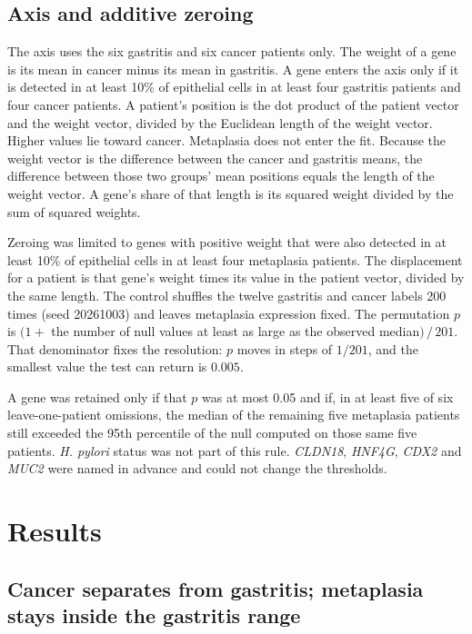 \documentclass[11pt,a4paper]{article}
\begin{document}
\subsection{Axis and additive zeroing}

The axis uses the six gastritis and six cancer patients only. The weight of a gene is its mean in cancer minus its mean in gastritis. A gene enters the axis only if it is detected in at least 10\% of epithelial cells in at least four gastritis patients and four cancer patients. A patient's position is the dot product of the patient vector and the weight vector, divided by the Euclidean length of the weight vector. Higher values lie toward cancer. Metaplasia does not enter the fit. Because the weight vector is the difference between the cancer and gastritis means, the difference between those two groups' mean positions equals the length of the weight vector. A gene's share of that length is its squared weight divided by the sum of squared weights.

Zeroing was limited to genes with positive weight that were also detected in at least 10\% of epithelial cells in at least four metaplasia patients. The displacement for a patient is that gene's weight times its value in the patient vector, divided by the same length. The control shuffles the twelve gastritis and cancer labels 200 times (seed 20261003) and leaves metaplasia expression fixed. The permutation \(p\) is \((1+\) the number of null values at least as large as the observed median\()\,/\,201\). That denominator fixes the resolution: \(p\) moves in steps of \(1/201\), and the smallest value the test can return is \(0.005\).

A gene was retained only if that \(p\) was at most 0.05 and if, in at least five of six leave-one-patient omissions, the median of the remaining five metaplasia patients still exceeded the 95th percentile of the null computed on those same five patients. \textit{H. pylori} status was not part of this rule. \textit{CLDN18}, \textit{HNF4G}, \textit{CDX2} and \textit{MUC2} were named in advance and could not change the thresholds.

\section{Results}

\subsection{Cancer separates from gastritis; metaplasia stays inside the gastritis range}
\end{document}
